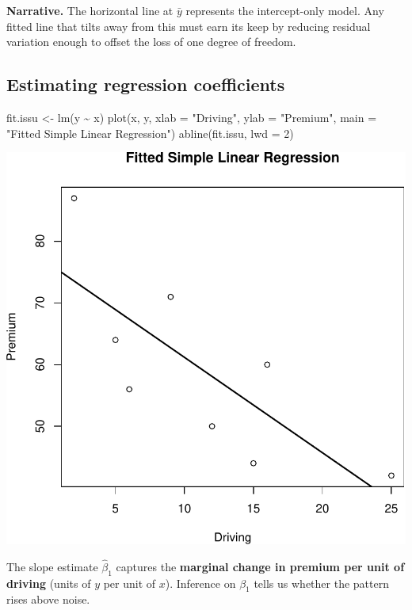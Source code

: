 \documentclass[
  letterpaper,
]{scrbook}
\newenvironment{Shaded}{\begin{snugshade}}{\end{snugshade}}
\newcommand{\AttributeTok}[1]{\textcolor[rgb]{0.40,0.45,0.13}{#1}}
\newcommand{\DecValTok}[1]{\textcolor[rgb]{0.68,0.00,0.00}{#1}}
\newcommand{\FunctionTok}[1]{\textcolor[rgb]{0.28,0.35,0.67}{#1}}
\newcommand{\NormalTok}[1]{\textcolor[rgb]{0.00,0.23,0.31}{#1}}
\newcommand{\OtherTok}[1]{\textcolor[rgb]{0.00,0.23,0.31}{#1}}
\newcommand{\SpecialCharTok}[1]{\textcolor[rgb]{0.37,0.37,0.37}{#1}}
\newcommand{\StringTok}[1]{\textcolor[rgb]{0.13,0.47,0.30}{#1}}
\begin{document}
\textbf{Narrative.} The horizontal line at \(\bar y\) represents the
intercept-only model. Any fitted line that tilts away from this must
earn its keep by reducing residual variation enough to offset the loss
of one degree of freedom.

\subsection{Estimating regression
coefficients}\label{estimating-regression-coefficients}

\begin{Shaded}
\begin{Highlighting}[]
\NormalTok{fit.issu }\OtherTok{\textless{}{-}} \FunctionTok{lm}\NormalTok{(y }\SpecialCharTok{\textasciitilde{}}\NormalTok{ x)}
\FunctionTok{plot}\NormalTok{(x, y, }\AttributeTok{xlab =} \StringTok{"Driving"}\NormalTok{, }\AttributeTok{ylab =} \StringTok{"Premium"}\NormalTok{,}
     \AttributeTok{main =} \StringTok{"Fitted Simple Linear Regression"}\NormalTok{)}
\FunctionTok{abline}\NormalTok{(fit.issu, }\AttributeTok{lwd =} \DecValTok{2}\NormalTok{)}
\end{Highlighting}
\end{Shaded}

\includegraphics{unit2-slr/slr_files/figure-pdf/unnamed-chunk-5-1.pdf}

The slope estimate \(\hat\beta_1\) captures the \textbf{marginal change
in premium per unit of driving} (units of \(y\) per unit of \(x\)).
Inference on \(\beta_1\) tells us whether the pattern rises above noise.
\end{document}
